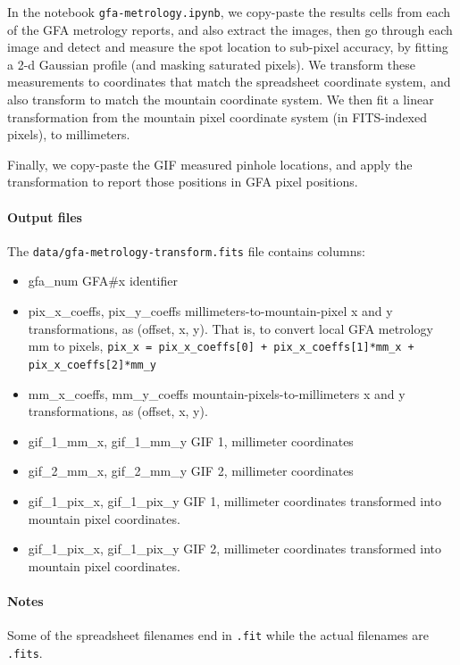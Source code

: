 \documentclass[10pt]{article}
\newcommand{\code}[1]{\texttt{#1}}
\begin{document}
In the notebook \code{gfa-metrology.ipynb}, we copy-paste the results
cells from each of the GFA metrology reports, and also extract the
images, then go through each image and detect and measure the spot
location to sub-pixel accuracy, by fitting a 2-d Gaussian profile (and
masking saturated pixels).  We transform these measurements to
coordinates that match the spreadsheet coordinate system, and also
transform to match the mountain coordinate system.  We then fit a
linear transformation from the mountain pixel coordinate system (in
FITS-indexed pixels), to millimeters.

Finally, we copy-paste the GIF measured pinhole locations, and apply
the transformation to report those positions in GFA pixel positions.

\paragraph{Output files}

The \code{data/gfa-metrology-transform.fits} file contains columns:
\begin{itemize}
\item{gfa\_num} GFA\#x identifier
\item{pix\_x\_coeffs, pix\_y\_coeffs} millimeters-to-mountain-pixel x and y transformations, as (offset, x, y).
  That is, to convert local GFA metrology mm to pixels, \code{pix\_x = pix\_x\_coeffs[0] + pix\_x\_coeffs[1]*mm\_x + pix\_x\_coeffs[2]*mm\_y}
\item{mm\_x\_coeffs, mm\_y\_coeffs} mountain-pixels-to-millimeters x and y transformations, as (offset, x, y).
\item{gif\_1\_mm\_x, gif\_1\_mm\_y} GIF 1, millimeter coordinates
\item{gif\_2\_mm\_x, gif\_2\_mm\_y} GIF 2, millimeter coordinates
\item{gif\_1\_pix\_x, gif\_1\_pix\_y} GIF 1, millimeter coordinates transformed
  into mountain pixel coordinates.
\item{gif\_1\_pix\_x, gif\_1\_pix\_y} GIF 2, millimeter coordinates transformed
  into mountain pixel coordinates.
\end{itemize}


\paragraph{Notes}

Some of the spreadsheet filenames end in \code{.fit} while the actual
filenames are \code{.fits}.
\end{document}
